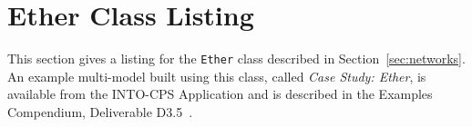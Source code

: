 \section{Ether Class Listing}
\label{app:ether}

This section gives a listing for the \texttt{Ether} class described in Section~\ref{sec:networks}. An example multi-model built using this class, called \emph{Case Study: Ether}, is available from the INTO-CPS Application and is described in the Examples Compendium, Deliverable D3.5~\cite{INTOCPSD3.5}.

\lstset{style=styleVDM}
\lstset{basicstyle=\ttfamily\scriptsize}

